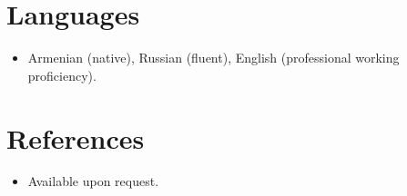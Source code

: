 \documentclass[11pt,a4paper,sans]{moderncv}
\begin{document}

\section{Languages}
\vspace{1pt}
\begin{itemize}
\item Armenian (native), Russian (fluent), English (professional working proficiency).
\end{itemize}


\section{References}
\vspace{1pt}
\begin{itemize}
\item{Available upon request.}
\end{itemize}
\end{document}
